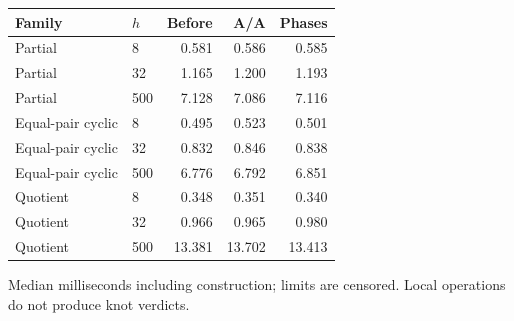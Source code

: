 \begin{center}\small
\begin{tabular}{@{}llrrr@{}}
\toprule
Family & $h$ & Before & A/A & Phases \\
\midrule
Partial & 8 & 0.581 & 0.586 & 0.585 \\
Partial & 32 & 1.165 & 1.200 & 1.193 \\
Partial & 500 & 7.128 & 7.086 & 7.116 \\
Equal-pair cyclic & 8 & 0.495 & 0.523 & 0.501 \\
Equal-pair cyclic & 32 & 0.832 & 0.846 & 0.838 \\
Equal-pair cyclic & 500 & 6.776 & 6.792 & 6.851 \\
Quotient & 8 & 0.348 & 0.351 & 0.340 \\
Quotient & 32 & 0.966 & 0.965 & 0.980 \\
Quotient & 500 & 13.381 & 13.702 & 13.413 \\
\bottomrule
\end{tabular}
\end{center}
Median milliseconds including construction; limits are censored. Local operations do not produce knot verdicts.
